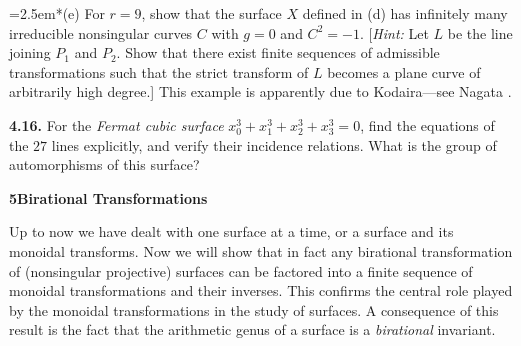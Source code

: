{\noindent\hangindent=2.5em\hspace*{.9em}*(e) For $r=9$, show that the surface $X$ defined in (d) has infinitely many irreducible nonsingular curves $C$ with $g=0$ and $C^2=-1$. [\emph{Hint:} Let $L$ be the line joining $P_1$ and $P_2$. Show that there exist finite sequences of admissible transformations such that the strict transform of $L$ becomes a plane curve of arbitrarily high degree.] This example is apparently due to Kodaira---see Nagata .

\smallskip
\noindent\hypertarget{ex-V-4.16}{}\textbf{4.16.} \EditionText{}For the \emph{Fermat cubic surface} $x_0^3+x_1^3+x_2^3+x_3^3=0$, find the equations of the $27$ lines explicitly, and verify their incidence relations. What is the group of automorphisms of this surface?

\bigskip
\noindent\hypertarget{sec-V-5}{}\textbf{\large 5\quad Birational Transformations}\par\medskip
\noindent Up to now we have dealt with one surface at a time, or a surface and its monoidal transforms. Now we will show that in fact any birational transformation of (nonsingular projective) surfaces can be factored into a finite sequence of monoidal transformations and their inverses. This confirms the central role played by the monoidal transformations in the study of surfaces. A consequence of this result is the fact that the arithmetic genus of a surface is a \emph{birational} invariant.}
